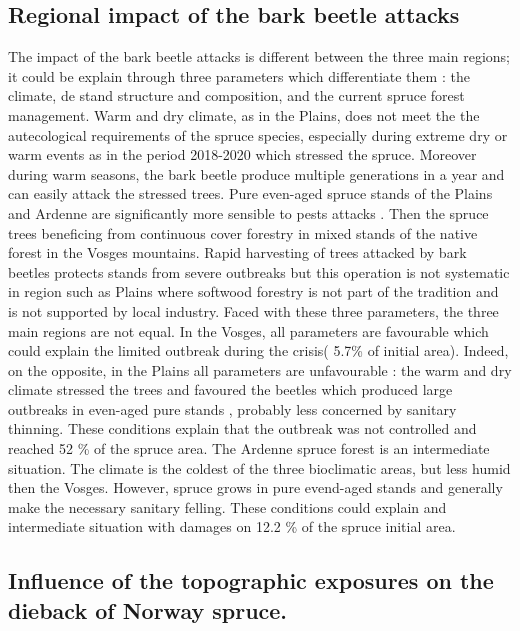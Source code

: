 \documentclass[3p,procedia]{elsarticle}
\begin{document}
\subsection{Regional impact of the bark beetle attacks}
The  impact of the bark beetle attacks is different between the three main regions;
it could be explain through three parameters which differentiate them : the climate, de stand structure and composition, and the current spruce forest management.
Warm and dry climate, as in the Plains, does not meet the the autecological requirements of the spruce species, especially during extreme dry or warm events as in the period 2018-2020 \citep{rousi_accelerated_2022} which stressed the spruce. Moreover during warm seasons, the bark beetle produce multiple generations in a year \citep{annila_influence_1969,baier_phenipscomprehensive_2007} and can easily attack the stressed trees.
Pure even-aged spruce stands of the Plains and Ardenne are significantly more sensible to pests attacks \citep{faccoli_composition_2014,jactel_2021}.
Then the spruce trees beneficing from continuous cover forestry in mixed stands of the native forest in the Vosges mountains.
Rapid harvesting of trees attacked by bark beetles protects stands from severe outbreaks \citep{stadelmann_effects_2013} but this operation is not systematic in region such as Plains where softwood forestry is not part of the tradition and is not supported by local industry.
Faced with these three parameters, the three main regions are not equal.
In the Vosges, all parameters are favourable which could explain the limited outbreak during the crisis( 5.7\% of initial area).
Indeed, on the opposite, in the Plains all parameters are unfavourable : the warm and dry climate stressed the trees and favoured the beetles which produced large outbreaks in even-aged pure stands , probably less concerned by sanitary thinning. 
These conditions explain that the outbreak was not controlled and reached 52 \% of the spruce area.
The Ardenne spruce forest is an intermediate situation.
The climate is the coldest of the three bioclimatic areas, but less humid then the Vosges.
However, spruce grows in pure evend-aged stands and generally make the necessary sanitary felling. These conditions could explain and intermediate situation with damages on 12.2 \% of the spruce initial area.


\subsection{Influence of the topographic exposures on the dieback of Norway spruce.}
\end{document}
